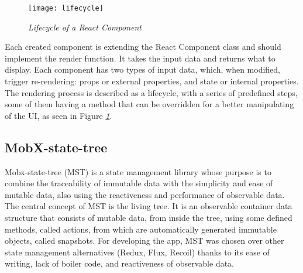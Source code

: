\begin{figure}[H]
  \centering
  \texttt{[image: lifecycle]}
  \caption{\emph{Lifecycle of a React Component}}
  \label{fig:lifecycle}
\end{figure}

Each created component is extending the React Component class
and should implement the render function.
It takes the input data and returns what to display.
Each component has two types of input data, which, when modified,
trigger re-rendering: props or external properties, and state or internal properties.
The rendering process is described as a lifecycle,
with a series of predefined steps,
some of them having a method that can be overridden
for a better manipulating of the UI, as seen in Figure \emph{\ref{fig:lifecycle}}.

\subsection{MobX-state-tree}
Mobx-state-tree (MST) is a state management library whose purpose
is to combine the traceability of immutable data with the simplicity
and ease of mutable data, also using the reactiveness
and performance of observable data.
The central concept of MST is the living tree.
It is an observable container data structure that consists of mutable data,
from inside the tree, using some defined methods, called actions,
from which are automatically generated immutable objects, called snapshots.
For developing the app, MST was chosen over other state management alternatives
(Redux, Flux, Recoil) thanks to its ease of writing,
lack of boiler code, and reactiveness of observable data.


